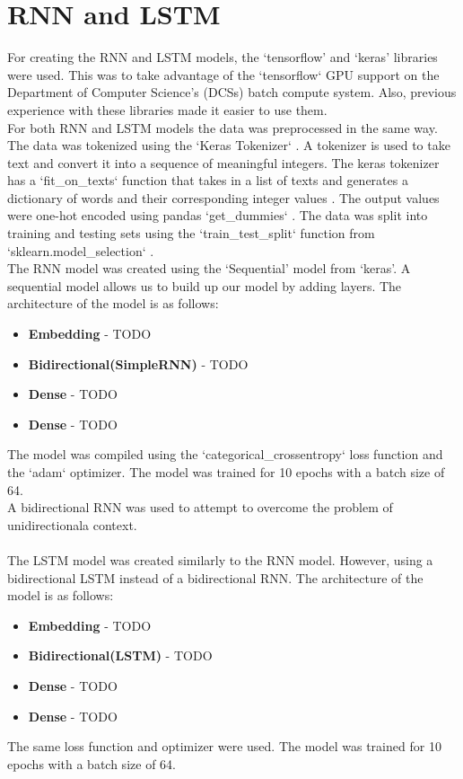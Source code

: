 \section{RNN and LSTM}
For creating the RNN and LSTM models, the `tensorflow' and `keras' libraries were used. This was to take advantage of the `tensorflow` GPU support on
the Department of Computer Science's (DCSs) batch compute system. Also, previous experience with these libraries made it easier to use them.\\
For both RNN and LSTM models the data was preprocessed in the same way. The data was tokenized using the `Keras Tokenizer` \cite{keras-tokenizer}. A tokenizer
is used to take text and convert it into a sequence of meaningful integers. The keras tokenizer has a `fit\_on\_texts` function that takes in a list of texts and
generates a dictionary of words and their corresponding integer values \cite{tftokenizer}. The output values were one-hot encoded using pandas `get\_dummies`
\cite{pandas-dummies}. The data was split into training and testing sets using the `train\_test\_split`
function from `sklearn.model\_selection` \cite{sklearn-split}.\\
The RNN model was created using the `Sequential' model from `keras'. A sequential model allows us to build up our model by adding layers. The architecture of the
model is as follows:
\begin{itemize}
    \item \textbf{Embedding} - TODO
    \item \textbf{Bidirectional(SimpleRNN)} - TODO
    \item \textbf{Dense} - TODO
    \item \textbf{Dense} - TODO
\end{itemize}
The model was compiled using the `categorical\_crossentropy` loss function and the `adam` optimizer. The model was trained for 10 epochs with a batch size of 64.\\
A bidirectional RNN was used to attempt to overcome the problem of unidirectionala context.\\\\
The LSTM model was created similarly to the RNN model. However, using a bidirectional LSTM instead of a bidirectional RNN. The architecture of the model is as follows:
\begin{itemize}
    \item \textbf{Embedding} - TODO
    \item \textbf{Bidirectional(LSTM)} - TODO
    \item \textbf{Dense} - TODO
    \item \textbf{Dense} - TODO
\end{itemize}
The same loss function and optimizer were used. The model was trained for 10 epochs with a batch size of 64.
